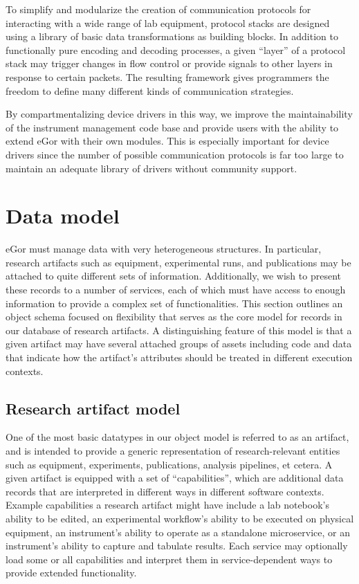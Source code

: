 \documentclass[../thesis]{subfiles}
\begin{document}
To simplify and modularize the creation of communication protocols for
interacting with a wide range of lab equipment, protocol stacks are
designed using a library of basic data transformations as building
blocks. In addition to functionally pure encoding and decoding
processes, a given ``layer'' of a protocol stack may trigger changes
in flow control or provide signals to other layers in response to
certain packets. The resulting framework gives programmers the freedom
to define many different kinds of communication strategies.

By compartmentalizing device drivers in this way, we improve the
maintainability of the instrument management code base and provide
users with the ability to extend eGor with their own
modules. This is especially important for device drivers since the
number of possible communication protocols is far too large to
maintain an adequate library of drivers without community support.



\section{Data model}
eGor must manage data with very heterogeneous structures. In
particular, research artifacts such as equipment, experimental runs,
and publications may be attached to quite different sets of
information. Additionally, we wish to present these records to a
number of services, each of which must have access to enough
information to provide a complex set of functionalities. This section
outlines an object schema focused on flexibility that serves as the
core model for records in our database of research artifacts.
A distinguishing feature of this model is that a given artifact may
have several attached groups of assets including code and data that
indicate how the artifact's attributes should be treated in different
execution contexts.


\subsection{Research artifact model}
One of the most basic datatypes in our object model is referred to as
an artifact, and is intended to provide a generic representation of
research-relevant entities such as equipment, experiments,
publications, analysis pipelines, et cetera.  A given artifact is
equipped with a set of ``capabilities'', which are additional data
records that are interpreted in different ways in different software
contexts. Example capabilities a research artifact might have include
a lab notebook's ability to be edited, an experimental workflow's
ability to be executed on physical equipment, an instrument's ability
to operate as a standalone microservice, or an instrument's ability to
capture and tabulate results. Each service may optionally
load some or all capabilities and interpret them in service-dependent
ways to provide extended functionality.
\end{document}
